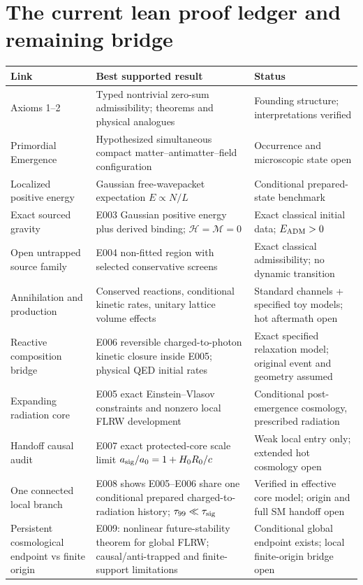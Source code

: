 \documentclass[11pt,a4paper]{article}
\theoremstyle{tmon}
\theoremstyle{definition}
\begin{document}
\section{The current lean proof ledger and remaining bridge}\label{sec:ledger}
\begin{table}[htbp]\centering\footnotesize\renewcommand{\arraystretch}{0.91}
\begin{tabularx}{\linewidth}{@{}p{.21\linewidth}Yp{.23\linewidth}@{}}\toprule
\textbf{Link} & \textbf{Best supported result} & \textbf{Status}\\\midrule
Axioms 1--2 & Typed nontrivial zero-sum admissibility; theorems and physical analogues & Founding structure; interpretations verified\\
Primordial Emergence & Hypothesized simultaneous compact matter--antimatter--field configuration & Occurrence and microscopic state open\\
Localized positive energy & Gaussian free-wavepacket expectation $E\propto N/L$ & Conditional prepared-state benchmark\\
Exact sourced gravity & E003 Gaussian positive energy plus derived binding; $\mathcal H=\mathcal M=0$ & Exact classical initial data; $E_{\rm ADM}>0$\\
Open untrapped source family & E004 non-fitted region with selected conservative screens & Exact classical admissibility; no dynamic transition\\
Annihilation and production & Conserved reactions, conditional kinetic rates, unitary lattice volume effects & Standard channels + specified toy models; hot aftermath open\\
Reactive composition bridge & E006 reversible charged-to-photon kinetic closure inside E005; physical QED initial rates & Exact specified relaxation model; original event and geometry assumed\\
Expanding radiation core & E005 exact Einstein--Vlasov constraints and nonzero local FLRW development & Conditional post-emergence cosmology, prescribed radiation\\
Handoff causal audit & E007 exact protected-core scale limit $a_{\rm sig}/a_0=1+H_0R_0/c$ & Weak local entry only; extended hot cosmology open\\
One connected local branch & E008 shows E005--E006 share one conditional prepared charged-to-radiation history; $\tau_{99}\ll\tau_{\rm sig}$ & Verified in effective core model; origin and full SM handoff open\\
Persistent cosmological endpoint vs finite origin & E009: nonlinear future-stability theorem for global FLRW; causal/anti-trapped and finite-support limitations & Conditional global endpoint exists; local finite-origin bridge open\\

\end{tabularx}
\end{table}
\end{document}
